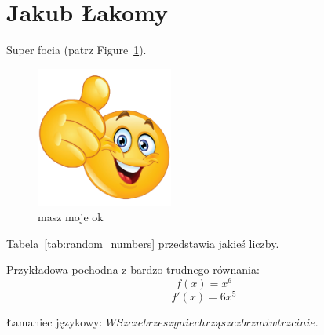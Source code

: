 \section{Jakub Łakomy}
\label{sec:lakomyjakub}

Super focia (patrz Figure~\ref{fig:like}).

\begin{figure}[htbp]
    \centering
    \includegraphics[width=0.4\textwidth]{pictures/like.png}
    \caption{masz moje ok}
    \label{fig:like}
\end{figure}

Tabela~\ref{tab:random_numbers} przedstawia jakieś liczby.



Przykładowa pochodna z bardzo trudnego równania: \[f(x) = x^6\]
\[f'(x) = 6x^5\]


Łamaniec językowy:
$ W Szczebrzeszynie chrząszcz brzmi w trzcinie. $